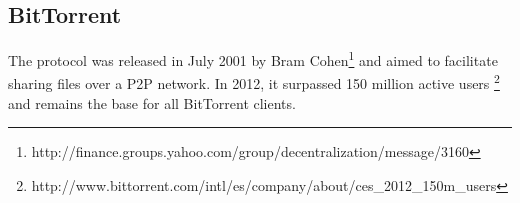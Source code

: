 \subsection{BitTorrent}
The protocol was released in July 2001 by Bram Cohen\footnote{http://finance.groups.yahoo.com/group/decentralization/message/3160} and aimed to facilitate sharing files over a P2P network. In 2012, it surpassed 150 million active users \footnote{http://www.bittorrent.com/intl/es/company/about/ces\_2012\_150m\_users} and remains the base for all BitTorrent clients.